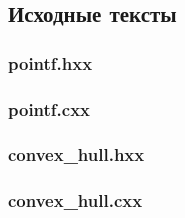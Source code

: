\documentclass[a4paper,12pt,notitlepage,headsepline,pdftex]{scrartcl}
\begin{document}
  \subsection*{Исходные тексты}
  \label{sec:apcode}
    \subsubsection*{pointf.hxx}
      
    \subsubsection*{pointf.cxx}
      
    \subsubsection*{convex\_hull.hxx}
      
    \subsubsection*{convex\_hull.cxx}
      

      \clearpage
    
    
\end{document}
